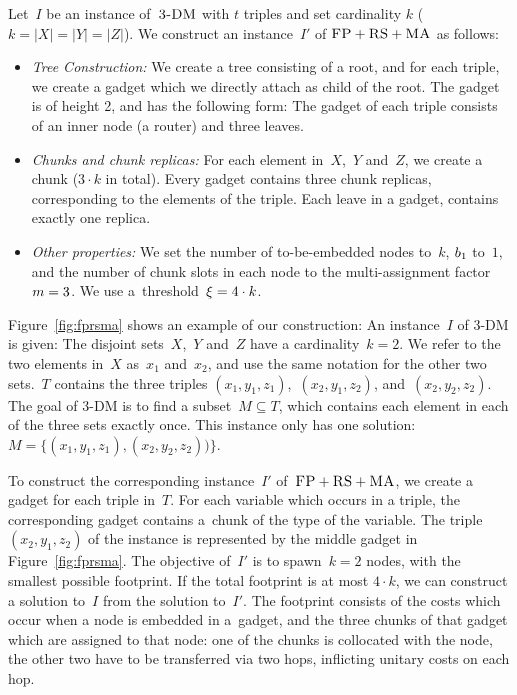Let~$I$ be an instance of~$\textsc{3-DM}$ with $t$ triples and set cardinality $k$ ($k = |X| = |Y| = |Z|$).
We construct an instance~$I'$ of
$\textsc{FP}+\textsc{RS}+\textsc{MA}$ as follows:
\begin{itemize}
\item \emph{Tree Construction:} We create a tree consisting of a root,
and for each triple, we create a gadget which we directly attach as
child of the root. The gadget is of height 2,
and has the following form:
The gadget of each triple consists of an inner node (a router) and three leaves.
\item \emph{Chunks and chunk replicas:} For each element in~$X$,~$Y$ and~$Z$,
 we create a chunk
($3 \cdot k$ in total). Every gadget contains three chunk replicas,
corresponding to the elements of the triple. Each leave in a gadget, contains
exactly one replica.
\item \emph{Other properties:} We set the number of to-be-embedded nodes to~$k$,
$b_1$ to~$1$, and the number of chunk slots in each node to the multi-assignment factor
$m=3$.
We use a~threshold~$\xi= 4
\cdot k$.
\end{itemize}

 Figure~\ref{fig:fprsma} shows an example of our construction: An
instance~$I$ of 3-DM is given: The disjoint sets~$X$,~$Y$ and~$Z$ have a
cardinality~$k=2$. We refer to the two elements in~$X$ as~$x_1$ and~$x_2$,
and use the same notation for the other two sets.~$T$ contains the three triples
$(x_1, y_1,
z_1)$,~$(x_2, y_1, z_2)$, and~$(x_2, y_2, z_2)$. The goal of 3-DM is to find a
subset~$M \subseteq T$, which contains each element in each of the three sets
exactly once. This instance only has one solution:~$M =
\{(x_1,y_1,z_1),(x_2,y_2,z_2))\}$.

To construct the corresponding instance~$I'$ of~$\textsc{FP}+\textsc{RS}+\textsc{MA}$, we
create a gadget for each triple in~$T$. For each variable which occurs in a
triple, the corresponding gadget contains a~chunk of the
type of the variable. The triple
$(x_2, y_1, z_2)$ of the instance is represented by the middle gadget in
Figure~\ref{fig:fprsma}. The objective of~$I'$ is to spawn~$k=2$ nodes,
with the smallest possible footprint. If the total footprint is at most $4\cdot k$, we can construct a solution to~$I$ from the solution to~$I'$.
The footprint consists of the costs which occur when a node is embedded in a~gadget, and the three chunks of that gadget which are assigned to that node: one of
the chunks is collocated with the node, the other two have to be transferred
via two hops, inflicting unitary costs on each hop.

